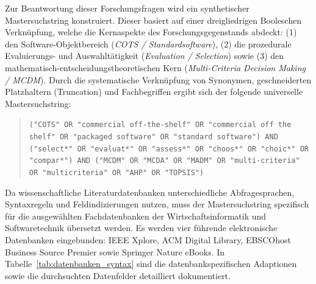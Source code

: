 Zur Beantwortung dieser Forschungsfragen wird ein synthetischer Mastersuchstring konstruiert. Dieser basiert auf einer dreigliedrigen Booleschen Verknüpfung, welche die Kernaspekte des Forschungsgegenstands abdeckt: (1) den Software-Objektbereich (\textit{COTS / Standardsoftware}), (2) die prozedurale Evaluierungs- und Auswahltätigkeit (\textit{Evaluation / Selection}) sowie (3) den mathematisch-entscheidungstheoretischen Kern (\textit{Multi-Criteria Decision Making / MCDM}). Durch die systematische Verknüpfung von Synonymen, geschneiderten Platzhaltern (Truncation) und Fachbegriffen ergibt sich der folgende universelle Mastersuchstring:

\begin{quote}
\texttt{("COTS" OR "commercial off-the-shelf" OR "commercial off the shelf" OR "packaged software" OR "standard software") AND ("select*" OR "evaluat*" OR "assess*" OR "choos*" OR "choic*" OR "compar*") AND ("MCDM" OR "MCDA" OR "MADM" OR "multi-criteria" OR "multicriteria" OR "AHP" OR "TOPSIS")}
\end{quote}

Da wissenschaftliche Literaturdatenbanken unterschiedliche Abfragesprachen, Syntaxregeln und Feldindizierungen nutzen, muss der Mastersuchstring spezifisch für die ausgewählten Fachdatenbanken der Wirtschaftsinformatik und Softwaretechnik übersetzt werden. Es werden vier führende elektronische Datenbanken eingebunden: IEEE Xplore, ACM Digital Library, EBSCOhost Business Source Premier sowie Springer Nature eBooks. In Tabelle~\ref{tab:datenbanken_syntax} sind die datenbankspezifischen Adaptionen sowie die durchsuchten Datenfelder detailliert dokumentiert.

